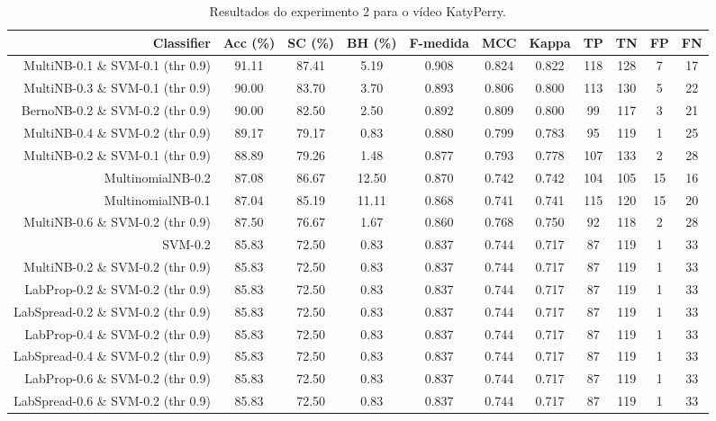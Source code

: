 \begin{table}[!htb]
\centering
\caption{Resultados do experimento 2 para o vídeo KatyPerry.}
\label{tab:KatyPerry}
\begin{tabular}{r|c|c|c|c|c|c|c|c|c|c}
\hline\hline
Classifier & Acc (\%) & SC (\%) & BH (\%) & F-medida & MCC & Kappa & TP & TN & FP & FN \\ \hline
MultiNB-0.1 \& SVM-0.1 (thr 0.9) & 91.11 & 87.41 & 5.19 & 0.908 & 0.824 & 0.822 & 118 & 128 & 7 & 17 \\ 
MultiNB-0.3 \& SVM-0.1 (thr 0.9) & 90.00 & 83.70 & 3.70 & 0.893 & 0.806 & 0.800 & 113 & 130 & 5 & 22 \\ 
BernoNB-0.2 \& SVM-0.2 (thr 0.9) & 90.00 & 82.50 & 2.50 & 0.892 & 0.809 & 0.800 & 99 & 117 & 3 & 21 \\ 
MultiNB-0.4 \& SVM-0.2 (thr 0.9) & 89.17 & 79.17 & 0.83 & 0.880 & 0.799 & 0.783 & 95 & 119 & 1 & 25 \\ 
MultiNB-0.2 \& SVM-0.1 (thr 0.9) & 88.89 & 79.26 & 1.48 & 0.877 & 0.793 & 0.778 & 107 & 133 & 2 & 28 \\ 
MultinomialNB-0.2 & 87.08 & 86.67 & 12.50 & 0.870 & 0.742 & 0.742 & 104 & 105 & 15 & 16 \\ 
MultinomialNB-0.1 & 87.04 & 85.19 & 11.11 & 0.868 & 0.741 & 0.741 & 115 & 120 & 15 & 20 \\ 
MultiNB-0.6 \& SVM-0.2 (thr 0.9) & 87.50 & 76.67 & 1.67 & 0.860 & 0.768 & 0.750 & 92 & 118 & 2 & 28 \\ 
SVM-0.2 & 85.83 & 72.50 & 0.83 & 0.837 & 0.744 & 0.717 & 87 & 119 & 1 & 33 \\ 
MultiNB-0.2 \& SVM-0.2 (thr 0.9) & 85.83 & 72.50 & 0.83 & 0.837 & 0.744 & 0.717 & 87 & 119 & 1 & 33 \\ 
LabProp-0.2 \& SVM-0.2 (thr 0.9) & 85.83 & 72.50 & 0.83 & 0.837 & 0.744 & 0.717 & 87 & 119 & 1 & 33 \\ 
LabSpread-0.2 \& SVM-0.2 (thr 0.9) & 85.83 & 72.50 & 0.83 & 0.837 & 0.744 & 0.717 & 87 & 119 & 1 & 33 \\ 
LabProp-0.4 \& SVM-0.2 (thr 0.9) & 85.83 & 72.50 & 0.83 & 0.837 & 0.744 & 0.717 & 87 & 119 & 1 & 33 \\ 
LabSpread-0.4 \& SVM-0.2 (thr 0.9) & 85.83 & 72.50 & 0.83 & 0.837 & 0.744 & 0.717 & 87 & 119 & 1 & 33 \\ 
LabProp-0.6 \& SVM-0.2 (thr 0.9) & 85.83 & 72.50 & 0.83 & 0.837 & 0.744 & 0.717 & 87 & 119 & 1 & 33 \\ 
LabSpread-0.6 \& SVM-0.2 (thr 0.9) & 85.83 & 72.50 & 0.83 & 0.837 & 0.744 & 0.717 & 87 & 119 & 1 & 33 \\ 

\end{tabular}
\end{table}
